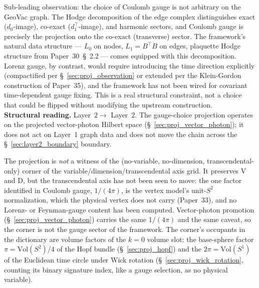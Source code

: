 \documentclass[11pt]{article}
\begin{document}
Sub-leading observation: the choice of Coulomb gauge is not arbitrary
on the GeoVac graph.  The Hodge decomposition of the edge complex
distinguishes exact ($d_0$-image), co-exact ($d_1^\top$-image), and
harmonic sectors, and Coulomb gauge is precisely the projection onto
the co-exact (transverse) sector.  The framework's natural data
structure --- $L_0$ on nodes, $L_1 = B^\top B$ on edges,
plaquette Hodge structure from Paper~30~\S~2.2 --- comes equipped
with this decomposition.  Lorenz gauge, by contrast, would require
introducing the time direction explicitly (compactified per
\S~\ref{sec:proj_observation} or extended per the Klein-Gordon
construction of Paper~35), and the framework has not been wired for
covariant time-dependent gauge fixing.  This is a real structural
constraint, not a choice that could be flipped without modifying the
upstream construction.\\
\textbf{Structural reading.}  Layer~$2 \to$ Layer~$2$.  The gauge-choice
projection operates on the projected vector-photon Hilbert space
(\S~\ref{sec:proj_vector_photon}); it does not act on Layer~1 graph
data and does not move the chain across the
\S~\ref{sec:layer2_boundary} boundary.

The projection is \emph{not} a witness of the (no-variable,
no-dimension, transcendental-only) corner of the
variable/dimension/transcendental axis grid.  It preserves V and D, but
the transcendental axis has not been seen to move: the one factor
identified in Coulomb gauge, $1/(4\pi)$, is the vertex model's
unit-$S^2$ normalization, which the physical vertex does not carry
(Paper~33), and no Lorenz- or Feynman-gauge content has been computed.
Vector-photon promotion (\S~\ref{sec:proj_vector_photon}) carries the
same $1/(4\pi)$ and the same caveat, so the corner is not the gauge
sector of the framework.  The corner's occupants in the dictionary are
volume factors of the $k = 0$ volume slot: the base-sphere factor
$\pi = \mathrm{Vol}(S^2)/4$ of the Hopf bundle (\S~\ref{sec:proj_hopf}) and the
$2\pi = \mathrm{Vol}(S^1)$ of the Euclidean time circle under Wick
rotation (\S~\ref{sec:proj_wick_rotation}, counting its binary signature
index, like a gauge selection, as no physical variable).
\end{document}
